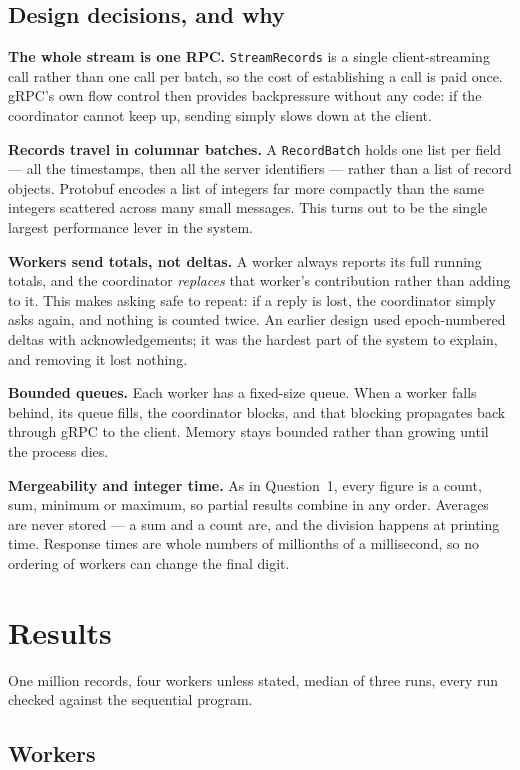 \documentclass[11pt,a4paper]{article}
\begin{document}
\subsection{Design decisions, and why}

\textbf{The whole stream is one RPC.} \texttt{StreamRecords} is a single
client-streaming call rather than one call per batch, so the cost of
establishing a call is paid once. gRPC's own flow control then provides
backpressure without any code: if the coordinator cannot keep up, sending simply
slows down at the client.

\textbf{Records travel in columnar batches.} A \texttt{RecordBatch} holds one
list per field --- all the timestamps, then all the server identifiers --- rather
than a list of record objects. Protobuf encodes a list of integers far more
compactly than the same integers scattered across many small messages. This
turns out to be the single largest performance lever in the system.

\textbf{Workers send totals, not deltas.} A worker always reports its full
running totals, and the coordinator \emph{replaces} that worker's contribution
rather than adding to it. This makes asking safe to repeat: if a reply is lost,
the coordinator simply asks again, and nothing is counted twice. An earlier
design used epoch-numbered deltas with acknowledgements; it was the hardest part
of the system to explain, and removing it lost nothing.

\textbf{Bounded queues.} Each worker has a fixed-size queue. When a worker falls
behind, its queue fills, the coordinator blocks, and that blocking propagates
back through gRPC to the client. Memory stays bounded rather than growing until
the process dies.

\textbf{Mergeability and integer time.} As in Question~1, every figure is a
count, sum, minimum or maximum, so partial results combine in any order.
Averages are never stored --- a sum and a count are, and the division happens at
printing time. Response times are whole numbers of millionths of a millisecond,
so no ordering of workers can change the final digit.

\section{Results}

One million records, four workers unless stated, median of three runs, every run
checked against the sequential program.

\subsection{Workers}
\end{document}
